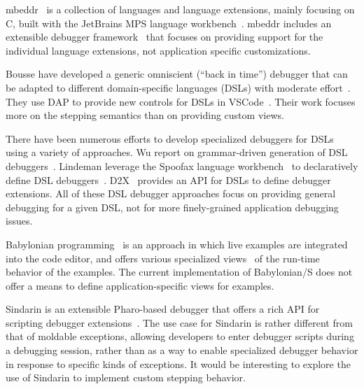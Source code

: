 \documentclass[sigplan,screen]{acmart} %
\begin{document}
mbeddr~\cite{Voel17a} is a collection of languages and language extensions, mainly focusing on C, built with the JetBrains MPS language workbench~\cite{Camp14a}.
mbeddr includes an extensible debugger framework~\cite{Pavl15a} that focuses on providing support for the individual language extensions, not application specific customizations.

Bousse \etal have developed a generic omniscient (``back in time'') debugger that can be adapted to different domain-specific languages (DSLs) with moderate effort~\cite{Bous18a}.
They use DAP to provide new controls for DSLs in VSCode~\cite{Enet23a}.
Their work focuses more on the stepping semantics than on providing custom views.

There have been numerous efforts to develop specialized debuggers for DSLs using a variety of approaches.
Wu \etal report on grammar-driven generation of DSL debuggers~\cite{HuiW08a}.
Lindeman \etal leverage the Spoofax language workbench~\cite{Kats10a} to declaratively define DSL debuggers~\cite{Lind11a}.
D2X~\cite{Brah23a} provides an API for DSLs to define debugger extensions.
All of these DSL debugger approaches focus on providing general debugging for a given DSL, not for more finely-grained application debugging issues.

Babylonian programming~\cite{Rau19a} is an approach in which live examples are integrated into the code editor, and offers various specialized  views~\cite{Rein24a} of the run-time behavior of the examples.
The current implementation of Babylonian/S does not offer a means to define application-specific views for examples.

Sindarin is an extensible Pharo-based debugger that offers a rich API for scripting debugger extensions~\cite{Dupr19a}.
The use case for Sindarin is rather different from that of moldable exceptions, allowing developers to enter debugger scripts during a debugging session, rather than as a way to enable specialized debugger behavior in response to specific kinds of exceptions.
It would be interesting to explore the use of Sindarin to implement custom stepping behavior.
\end{document}

